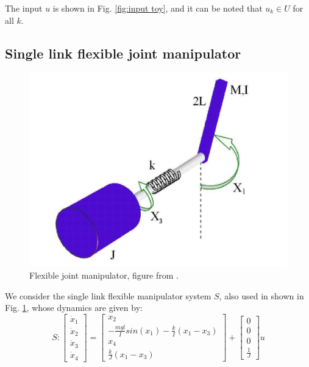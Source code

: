 
The input $u$ is shown in Fig. \ref{fig:input toy}, and it can be noted that $u_k \in U$ for all $k$.

\subsection{Single link flexible joint manipulator}
\label{sec:manipulator}

\begin{figure}
	\includegraphics[scale=0.15]{figs/ManipArm.pdf}
	\caption{Flexible joint manipulator, figure from \cite{intech}.}
	\label{fig:manipulator fig}
\end{figure}

We consider the single link flexible manipulator system $S$, also used in \cite{intech}  shown in Fig. \ref{fig:manipulator fig}, whose dynamics are given by:
\begin{equation}
S: \begin{bmatrix} \dot{x}_1 \\ \dot{x}_2 \\ \dot{x}_3 \\ \dot{x}_4    \end{bmatrix} = \begin{bmatrix} x_2 \\ -\frac{mgl}{I}sin(x_1) - \frac{k}{I}(x_1-x_3)  \\ x_4 \\ \frac{k}{J}(x_1-x_3)  \end{bmatrix} + \begin{bmatrix} 0 \\ 0 \\ 0 \\ \frac{1}{J} \end{bmatrix}u
\end{equation}


